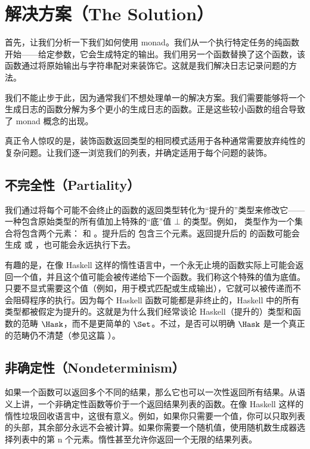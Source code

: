 \section{解决方案（The Solution）}

首先，让我们分析一下我们如何使用  monad。我们从一个执行特定任务的纯函数开始——给定参数，它会生成特定的输出。我们用另一个函数替换了这个函数，该函数通过将原始输出与字符串配对来装饰它。这就是我们解决日志记录问题的方法。

我们不能止步于此，因为通常我们不想处理单一的解决方案。我们需要能够将一个生成日志的函数分解为多个更小的生成日志的函数。正是这些较小函数的组合导致了 monad 概念的出现。

真正令人惊叹的是，装饰函数返回类型的相同模式适用于各种通常需要放弃纯性的复杂问题。让我们逐一浏览我们的列表，并确定适用于每个问题的装饰。

\subsection{不完全性（Partiality）}

我们通过将每个可能不会终止的函数的返回类型转化为“提升的”类型来修改它——一种包含原始类型的所有值加上特殊的“底”值 $\bot$ 的类型。例如， 类型作为一个集合将包含两个元素： 和 。提升后的  包含三个元素。返回提升后的  的函数可能会生成  或 ，也可能会永远执行下去。

有趣的是，在像 Haskell 这样的惰性语言中，一个永无止境的函数实际上可能会返回一个值，并且这个值可能会被传递给下一个函数。我们称这个特殊的值为底值。只要不显式需要这个值（例如，用于模式匹配或生成输出），它就可以被传递而不会阻碍程序的执行。因为每个 Haskell 函数可能都是非终止的，Haskell 中的所有类型都被假定为提升的。这就是为什么我们经常谈论 Haskell（提升的）类型和函数的范畴 $\Hask$，而不是更简单的 $\Set$。不过，是否可以明确 $\Hask$ 是一个真正的范畴仍不清楚（参见这篇 ）。

\subsection{非确定性（Nondeterminism）}

如果一个函数可以返回多个不同的结果，那么它也可以一次性返回所有结果。从语义上讲，一个非确定性函数等价于一个返回结果列表的函数。在像 Haskell 这样的惰性垃圾回收语言中，这很有意义。例如，如果你只需要一个值，你可以只取列表的头部，其余部分永远不会被计算。如果你需要一个随机值，使用随机数生成器选择列表中的第 n 个元素。惰性甚至允许你返回一个无限的结果列表。

